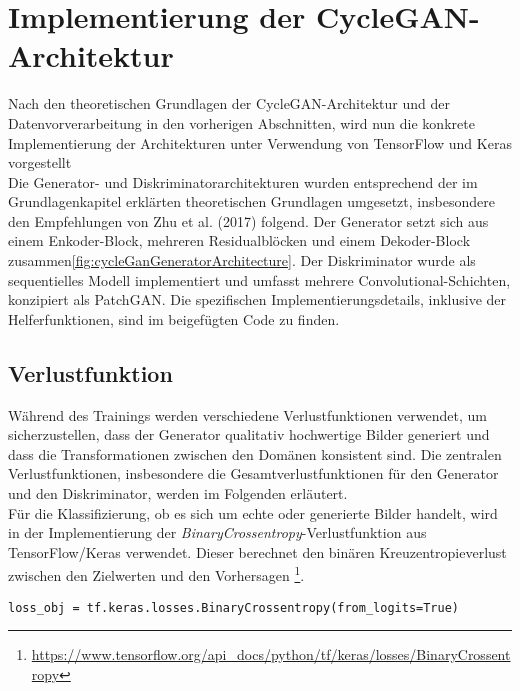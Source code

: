 \section{Implementierung der CycleGAN-Architektur}
Nach den theoretischen Grundlagen der CycleGAN-Architektur und der Datenvorverarbeitung in den vorherigen Abschnitten, wird nun die konkrete Implementierung der Architekturen unter Verwendung von TensorFlow und Keras vorgestellt 
\\
Die Generator- und Diskriminatorarchitekturen wurden entsprechend der im Grundlagenkapitel erklärten theoretischen Grundlagen umgesetzt, insbesondere den Empfehlungen von Zhu et al. (2017)\cite{Zhu.2017} folgend. Der Generator setzt sich aus einem Enkoder-Block, mehreren Residualblöcken und einem Dekoder-Block zusammen\ref{fig:cycleGanGeneratorArchitecture}. Der Diskriminator wurde als sequentielles Modell implementiert und umfasst mehrere Convolutional-Schichten, konzipiert als PatchGAN.
Die spezifischen Implementierungsdetails, inklusive der Helferfunktionen, sind im beigefügten Code zu finden.

\subsection{Verlustfunktion}
Während des Trainings werden verschiedene Verlustfunktionen verwendet, um sicherzustellen, dass der Generator qualitativ hochwertige Bilder generiert und dass die Transformationen zwischen den Domänen konsistent sind. Die zentralen Verlustfunktionen, insbesondere die Gesamtverlustfunktionen für den Generator und den Diskriminator, werden im Folgenden erläutert. 
\\
Für die Klassifizierung, ob es sich um echte oder generierte Bilder handelt, wird in der Implementierung der \textit{BinaryCrossentropy}-Verlustfunktion aus TensorFlow/Keras verwendet. 
Dieser berechnet den binären Kreuzentropieverlust zwischen den Zielwerten und den Vorhersagen \footnote{\url{https://www.tensorflow.org/api_docs/python/tf/keras/losses/BinaryCrossentropy}}.

\begin{lstlisting}[language=pyhaff, caption={Initialisierung des BinaryCrossentropy-Verlustfunktion}, label={cod:binaryCrossentropy}]
loss_obj = tf.keras.losses.BinaryCrossentropy(from_logits=True)
\end{lstlisting}


